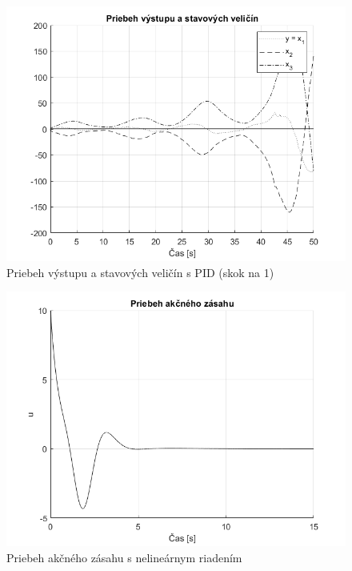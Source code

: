\documentclass[../main.tex]{subfiles}
\begin{document}
	\begin{figure}[h!]
		\centering
		\includegraphics[width=0.8\linewidth]{SimulaciaPIDVelkySkok}
		\caption{Priebeh výstupu a stavových veličín s PID (skok na 1)}
		\label{fig:svlvs2_SimulaciaPIDVelkySkok}
	\end{figure}

	\begin{figure}[h!]
		\centering
		\includegraphics[width=0.8\linewidth]{SimulaciaNelinU}
		\caption{Priebeh akčného zásahu s nelineárnym riadením}
		\label{fig:svlvs2_simulaciaNelinU}
	\end{figure}
\end{document}
